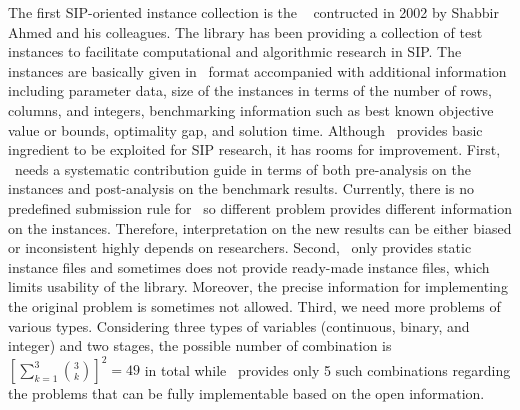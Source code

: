 The first SIP-oriented instance collection is the \siplib\ \cite{web:SIPLIB1} contructed in 2002 by Shabbir Ahmed and his colleagues. The library has been providing a collection of test instances to facilitate computational and algorithmic research in SIP. The instances are basically given in \smps\ format accompanied with additional information including parameter data, size of the instances in terms of the number of rows, columns, and integers, benchmarking information such as best known objective value or bounds, optimality gap, and solution time. Although \siplib\ provides basic ingredient to be exploited for SIP research, it has rooms for improvement. First, \siplib\ needs a systematic contribution guide in terms of both pre-analysis on the instances and post-analysis on the benchmark results. Currently, there is no predefined submission rule for \siplib\ so different problem provides different information on the instances. Therefore, interpretation on the new results can be either biased or inconsistent highly depends on researchers. Second, \siplib\ only provides static instance files and sometimes does not provide ready-made instance files, which limits usability of the library. Moreover, the precise information for implementing the original problem is sometimes not allowed. Third, we need more problems of various types. Considering three types of variables (continuous, binary, and integer) and two stages, the possible number of combination is $\left[\sum_{k=1}^3\binom{3}{k}\right]^2=49$ in total while \siplib\ provides only 5 such combinations regarding the problems that can be fully implementable based on the open information.







